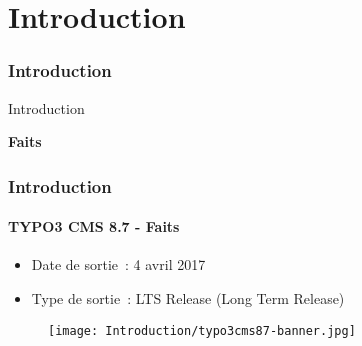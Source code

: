 %

\section{Introduction}
\begin{frame}[fragile]
	\frametitle{Introduction}

	\begin{center}\huge{Introduction}\end{center}
	\begin{center}\huge{\color{typo3darkgrey}\textbf{Faits}}\end{center}

\end{frame}

\begin{frame}[fragile]
	\frametitle{Introduction}
	\framesubtitle{TYPO3 CMS 8.7 - Faits}

	\begin{itemize}
		\item Date de sortie~: 4 avril 2017
		\item Type de sortie~: LTS Release (Long Term Release)
	\end{itemize}

	\begin{figure}
		\texttt{[image: Introduction/typo3cms87-banner.jpg]}
	\end{figure}

\end{frame}

